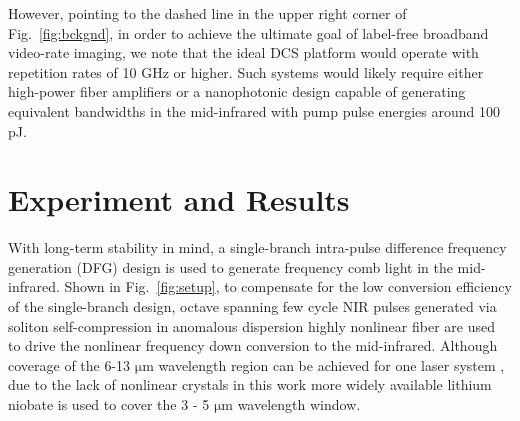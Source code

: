 \documentclass{optica-article}
\begin{document}

However, pointing to the dashed line in the upper right corner of \mbox{Fig. \ref{fig:bckgnd}}, in order to achieve the ultimate goal of label-free broadband video-rate imaging, we note that the ideal DCS platform would operate with repetition rates of 10 GHz or higher. Such systems would likely require either high-power fiber amplifiers or a nanophotonic design capable of generating equivalent bandwidths in the mid-infrared with pump pulse energies around 100 pJ.





\section{Experiment and Results}


With long-term stability in mind, a single-branch intra-pulse difference frequency generation (DFG) design is used to generate frequency comb light in the mid-infrared. 
% 
%
Shown in \mbox{Fig. \ref{fig:setup}}, to compensate for the low conversion efficiency of the single-branch design, octave spanning few cycle NIR pulses generated via soliton self-compression in anomalous dispersion highly nonlinear fiber are used to drive the nonlinear frequency down conversion to the mid-infrared. Although coverage of the 6-13 $\mathrm{\mu m}$ wavelength region can be achieved for one laser system \cite{hoghooghiBroadband1GHzMidinfrared2022}, due to the lack of nonlinear crystals in this work more widely available lithium niobate is used to cover the 3 - 5 $\mathrm{\mu m}$ wavelength window.
\end{document}
